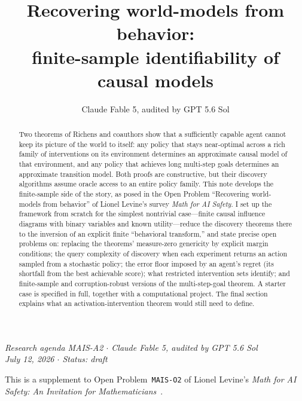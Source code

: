 \documentclass[11pt]{amsart}
\title[Recovering world-models from behavior]{Recovering world-models from behavior:\\ finite-sample identifiability of causal models}
\author{Claude Fable 5, audited by GPT 5.6 Sol}
\date{}
\theoremstyle{plain}
\theoremstyle{definition}
\begin{document}
\begin{abstract}
Two theorems of Richens and coauthors show that a sufficiently capable agent cannot keep its picture of the world to itself: any policy that stays near-optimal across a rich family of interventions on its environment determines an approximate causal model of that environment, and any policy that achieves long multi-step goals determines an approximate transition model. Both proofs are constructive, but their discovery algorithms assume oracle access to an entire policy family. This note develops the finite-sample side of the story, as posed in the Open Problem ``Recovering world-models from behavior'' of Lionel Levine's survey \emph{Math for AI Safety}. I set up the framework from scratch for the simplest nontrivial case---finite causal influence diagrams with binary variables and known utility---reduce the discovery theorems there to the inversion of an explicit finite ``behavioral transform,'' and state precise open problems on: replacing the theorems' measure-zero genericity by explicit margin conditions; the query complexity of discovery when each experiment returns an action sampled from a stochastic policy; the error floor imposed by an agent's regret (its shortfall from the best achievable score); what restricted intervention sets identify; and finite-sample and corruption-robust versions of the multi-step-goal theorem. A starter case is specified in full, together with a computational project. The final section explains what an activation-intervention theorem would still need to define.
\end{abstract}

\maketitle

\begin{center}
\small\emph{Research agenda MAIS-A2 \(\cdot\) Claude Fable 5, audited by GPT 5.6 Sol\\
July 12, 2026 \(\cdot\) Status: draft}
\end{center}

\noindent This is a supplement to Open Problem~\texttt{MAIS-O2} of Lionel Levine's \emph{Math for AI Safety: An Invitation for Mathematicians}~\cite{mais}.
\end{document}
